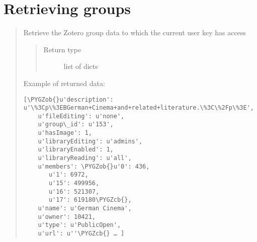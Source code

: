 \documentclass[letterpaper,10pt,english]{sphinxmanual}
\def\PYGZob{\char`\{}
\def\PYGZcb{\char`\}}
\begin{document}
\section{Retrieving groups}
\label{index:retrieving-groups}\begin{quote}

\begin{fulllineitems}
\label{index:pyzotero.zotero.Zotero.groups}
Retrieve the Zotero group data to which the current user key has access
\begin{quote}\begin{description}
\item[{Return type}] \leavevmode
list of dicts

\end{description}\end{quote}

Example of returned data:

\begin{Verbatim}[commandchars=\\\{\}]
[\PYGZob{}u'description': u'\%3Cp\%3EBGerman+Cinema+and+related+literature.\%3C\%2Fp\%3E',
    u'fileEditing': u'none',
    u'group\_id': u'153',
    u'hasImage': 1,
    u'libraryEditing': u'admins',
    u'libraryEnabled': 1,
    u'libraryReading': u'all',
    u'members': \PYGZob{}u'0': 436,
       u'1': 6972,
       u'15': 499956,
       u'16': 521307,
       u'17': 619180\PYGZcb{},
    u'name': u'German Cinema',
    u'owner': 10421,
    u'type': u'PublicOpen',
    u'url': u''\PYGZcb{} … ]
\end{Verbatim}

\end{fulllineitems}

\end{quote}
\end{document}
